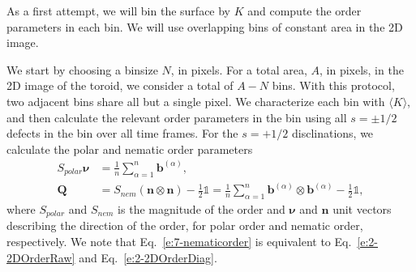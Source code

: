 As a first attempt, we will bin the surface by $K$ and compute the order parameters in each bin.
We will use overlapping bins of constant area in the 2D image.

We start by choosing a binsize $N$, in pixels.
For a total area, $A$, in pixels, in the 2D image of the toroid, we consider a total of $A-N$ bins.
With this protocol, two adjacent bins share all but a single pixel.
We characterize each bin with $\langle K \rangle$, and then calculate the relevant order parameters in the bin using all $s = \pm 1/2$ defects in the bin over all time frames.
For the $s = +1/2$ disclinations, we calculate the polar and nematic order parameters
\begin{align}
  S_{polar} \bm{\nu} &= \frac{1}{n} \sum\limits_{\alpha=1}^n \mathbf{b}^{(\alpha)},\label{e:7-polarorder} \\
  \mathbf{Q} &= S_{nem} \left (\mathbf{n} \otimes \mathbf{n} \right ) - \frac{1}{2}\mathbb{1} = \frac{1}{n} \sum\limits_{\alpha=1}^n \mathbf{b}^{(\alpha)} \otimes \mathbf{b}^{(\alpha)} - \frac{1}{2}\mathbb{1}\label{e:7-nematicorder},
\end{align}
where $S_{polar}$ and $S_{nem}$ is the magnitude of the order and $\bm{\nu}$ and $\mathbf{n}$ unit vectors describing the direction of the order, for polar order and nematic order, respectively.
We note that Eq.~\ref{e:7-nematicorder} is equivalent to Eq.~\ref{e:2-2DOrderRaw} and Eq.~\ref{e:2-2DOrderDiag}.

